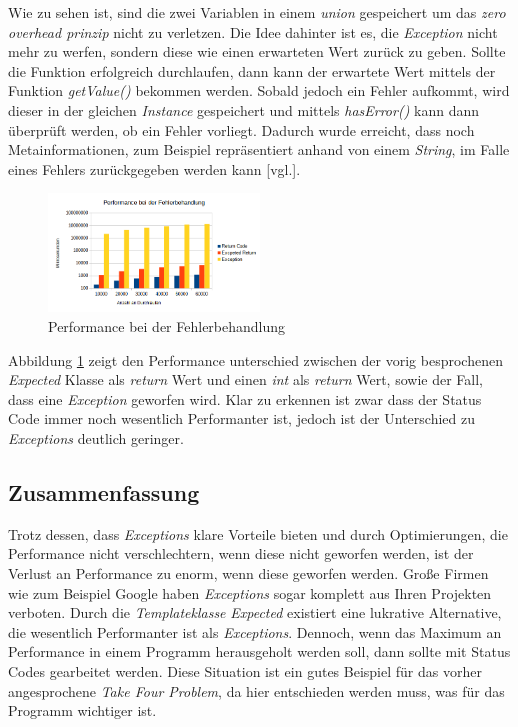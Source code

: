 Wie zu sehen ist, sind die zwei Variablen in einem \emph{union} gespeichert um das \emph{zero
overhead prinzip} nicht zu verletzen. Die Idee dahinter ist es, die \emph{Exception} nicht mehr
zu werfen, sondern diese wie einen erwarteten Wert zurück zu geben. Sollte die Funktion
erfolgreich durchlaufen, dann kann der erwartete Wert mittels der Funktion \emph{getValue()}
bekommen werden. Sobald jedoch ein Fehler aufkommt, wird dieser in der gleichen \emph{Instance}
gespeichert und mittels \emph{hasError()} kann dann überprüft werden, ob ein Fehler vorliegt.
Dadurch wurde erreicht, dass noch Metainformationen, zum Beispiel repräsentiert anhand von einem
\emph{String}, im Falle eines Fehlers zurückgegeben werden kann \cite{OverheadExceptions}[vgl.].
\newline

\begin{figure}[h]
    \centering
    \includegraphics[width=0.5\textwidth]{bilder/Performance_Fehlerbehandlung}
    \caption[Fehlerbehandlung]{Performance bei der Fehlerbehandlung}
    \label{img:fehlerbehandlung}
\end{figure}

Abbildung \ref{img:fehlerbehandlung} zeigt den Performance unterschied zwischen der vorig
besprochenen \emph{Expected} Klasse als \emph{return} Wert und einen \emph{int} als \emph{return}
Wert, sowie der Fall, dass eine \emph{Exception} geworfen wird. Klar zu erkennen ist zwar dass
der Status Code immer noch wesentlich Performanter ist, jedoch ist der Unterschied zu
\emph{Exceptions} deutlich geringer.

\subsection{Zusammenfassung}
Trotz dessen, dass \emph{Exceptions} klare Vorteile bieten und durch Optimierungen, die
Performance nicht verschlechtern, wenn diese nicht geworfen werden, ist der Verlust an
Performance zu enorm, wenn diese geworfen werden. Große Firmen wie zum Beispiel Google haben
\emph{Exceptions} sogar komplett aus Ihren Projekten verboten. Durch die \emph{Templateklasse}
\emph{Expected} existiert eine lukrative Alternative, die wesentlich Performanter ist als
\emph{Exceptions}. Dennoch, wenn das Maximum an Performance in einem Programm herausgeholt werden
soll, dann sollte mit Status Codes gearbeitet werden. Diese Situation ist ein gutes Beispiel für
das vorher angesprochene \emph{Take Four Problem}, da hier entschieden werden muss, was für das
Programm wichtiger ist.